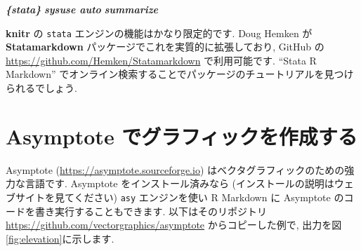 \documentclass[
  11pt,
  lualatex,ja=standard,jafont=noto]{bxjsreport}
\newenvironment{Shaded}{\begin{snugshade}}{\end{snugshade}}
\newcommand{\InformationTok}[1]{\textcolor[rgb]{0.56,0.35,0.01}{\textbf{\textit{#1}}}}
\begin{document}
\begin{Shaded}
\begin{Highlighting}[]
\InformationTok{\textasciigrave{}\textasciigrave{}\textasciigrave{}\{stata\}}
\InformationTok{sysuse auto}
\InformationTok{summarize}
\InformationTok{\textasciigrave{}\textasciigrave{}\textasciigrave{}}
\end{Highlighting}
\end{Shaded}

\textbf{knitr} の \texttt{stata} エンジンの機能はかなり限定的です. Doug Hemken が \textbf{Statamarkdown} パッケージでこれを実質的に拡張しており, GitHub の \url{https://github.com/Hemken/Statamarkdown} で利用可能です. ``Stata R Markdown'' でオンライン検索することでパッケージのチュートリアルを見つけられるでしょう.

\hypertarget{eng-asy}{%
\section{Asymptote でグラフィックを作成する}\label{eng-asy}}

Asymptote (\url{https://asymptote.sourceforge.io}) はベクタグラフィックのための強力な言語です. Asymptote をインストール済みなら (インストールの説明はウェブサイトを見てください) \texttt{asy} エンジンを使い R Markdown に Asymptote のコードを書き実行することもできます. 以下はそのリポジトリ \url{https://github.com/vectorgraphics/asymptote} からコピーした例で, 出力を図\ref{fig:elevation}に示します.
\end{document}
